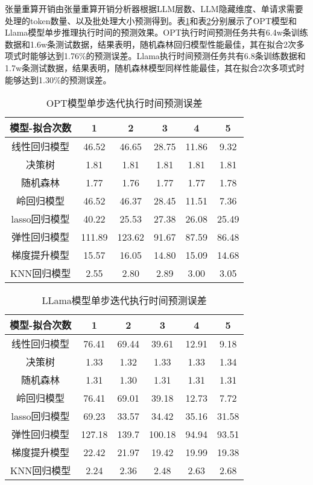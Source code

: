 张量重算开销由张量重算开销分析器根据LLM层数、LLM隐藏维度、单请求需要处理的token数量、以及批处理大小预测得到。表\ref{Table:OPT模型单步迭代执行时间预测误差}和表\ref{Table:LLama模型单步迭代执行时间预测误差}分别展示了OPT模型和Llama模型单步推理执行时间的预测效果。OPT执行时间预测任务共有6.4w条训练数据和1.6w条测试数据，结果表明，随机森林回归模型性能最佳，其在拟合2次多项式时能够达到1.76\%的预测误差。Llama执行时间预测任务共有6.8条训练数据和1.7w条测试数据，结果表明，随机森林模型同样性能最佳，其在拟合2次多项式时能够达到1.30\%的预测误差。

\begin{table}[H]
  \centering
  \caption{OPT模型单步迭代执行时间预测误差}
  \label{Table:OPT模型单步迭代执行时间预测误差}
  \renewcommand{\arraystretch}{1.25}
  \small
  \begin{tabular}{c c c c c c}
    \toprule
    \textbf{模型-拟合次数} & \textbf{1} & \textbf{2} & \textbf{3} & \textbf{4} & \textbf{5} \\
    \midrule
    线性回归模型 & 46.52 & 46.65 & 28.75 & 11.86 & 9.32 \\ 
    决策树 & 1.81 & 1.81 & 1.81 & 1.81 & 1.81 \\ 
    随机森林 & 1.77 & 1.76 & 1.77 & 1.77 & 1.78 \\ 
    岭回归模型 & 46.52 & 46.37 & 28.45 & 11.51 & 7.36 \\ 
    lasso回归模型 & 40.22 & 25.53 & 27.38 & 26.08 & 25.49 \\ 
    弹性回归模型 & 111.89 & 123.62 & 91.67 & 87.59 & 86.48 \\ 
    梯度提升模型 & 15.57 & 16.05 & 14.80 & 15.09 & 14.68 \\ 
    KNN回归模型 & 2.55 & 2.80 & 2.89 & 3.00 & 3.05 \\ 
    \bottomrule
  \end{tabular}
\end{table}

\begin{table}[H]
  \centering
  \caption{LLama模型单步迭代执行时间预测误差}
  \label{Table:LLama模型单步迭代执行时间预测误差}
  \renewcommand{\arraystretch}{1.25}
  \small
  \begin{tabular}{c c c c c c}
    \toprule
    \textbf{模型-拟合次数} & \textbf{1} & \textbf{2} & \textbf{3} & \textbf{4} & \textbf{5} \\
    \midrule
    线性回归模型 & 76.41 & 69.44 & 39.61 & 12.91 & 9.18 \\ 
    决策树 & 1.33 & 1.32 & 1.33 & 1.33 & 1.34 \\ 
    随机森林 & 1.31 & 1.30 & 1.31 & 1.31 & 1.31 \\ 
    岭回归模型 & 76.41 & 69.01 & 39.18 & 12.73 & 7.72 \\ 
    lasso回归模型 & 69.23 & 33.57 & 34.42 & 35.16 & 31.58  \\ 
    弹性回归模型 & 127.18 & 139.7 & 100.18 & 94.94 & 93.51  \\ 
    梯度提升模型 & 22.42 & 21.97 & 19.42 & 19.99 & 19.38  \\ 
    KNN回归模型 & 2.24 & 2.36 & 2.48 & 2.63 & 2.68 \\ 
    \bottomrule
  \end{tabular}
\end{table}

